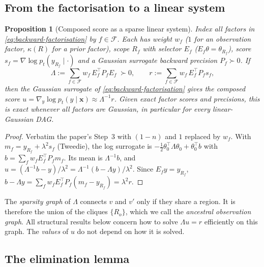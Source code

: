 \documentclass[11pt]{article}
\newtheorem{proposition}[theorem]{Proposition}
\theoremstyle{definition}
\theoremstyle{remark}
\newcommand{\T}{\top}
\newcommand{\lam}{\lambda}
\newcommand{\X}{\mathbf{x}}
\newcommand{\Fset}{\mathcal{F}}
\begin{document}
\subsection{From the factorisation to a linear system}

\begin{proposition}[Composed score as a sparse linear system]\label{prop:linear-system}
Index all factors in \eqref{eq:backward-factorisation} by $f\in\Fset$. Each has
weight $w_f$ ($1$ for an observation factor, $\kappa(R)$ for a prior factor),
scope $R_f$ with selector $E_f$ ($E_f\theta=\theta_{R_f}$), score
$s_f=\nabla\log p_t(y_{R_f}\mid\cdot)$ and a Gaussian surrogate backward
precision $P_f\succ0$. If
\begin{equation}\label{eq:Lambda}
\Lambda:=\sum_{f\in\Fset}w_f\,E_f^\T P_fE_f\;\succ0,\qquad r:=\sum_{f\in\Fset}w_f\,E_f^\T P_fs_f,
\end{equation}
then the Gaussian surrogate of \eqref{eq:backward-factorisation} gives the
composed score $u=\nabla_y\log p_t(y\mid\X)\approx\Lambda^{-1}r$. Given exact
factor scores and precisions, this is exact whenever all factors are Gaussian, in
particular for every linear-Gaussian DAG.
\end{proposition}
\begin{proof}
Verbatim the paper's Step~3 with $(1-n)$ and $1$ replaced by $w_f$. With
$m_f=y_{R_f}+\lam^2s_f$ (Tweedie), the log surrogate is
$-\tfrac12\theta_0^\T\Lambda\theta_0+\theta_0^\T b$ with
$b=\sum_fw_fE_f^\T P_fm_f$. Its mean is $\Lambda^{-1}b$, and
$u=(\Lambda^{-1}b-y)/\lam^2=\Lambda^{-1}(b-\Lambda y)/\lam^2$. Since
$E_fy=y_{R_f}$, $b-\Lambda y=\sum_fw_fE_f^\T P_f(m_f-y_{R_f})=\lam^2r$.
\end{proof}

The \emph{sparsity graph} of $\Lambda$ connects $v$ and $v'$ only if they share a
region. It is therefore the union of the cliques $\{R_o\}$, which we call the
\emph{ancestral observation graph}. All structural results below concern how to
solve $\Lambda u=r$ efficiently on this graph. The \emph{values} of $u$ do not
depend on how it is solved.

\subsection{The elimination lemma}
\end{document}
